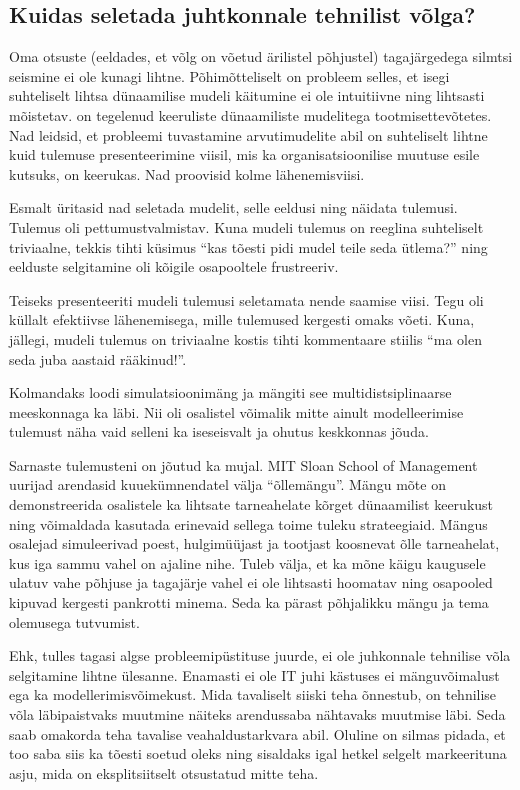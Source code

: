 \subsection{Kuidas seletada juhtkonnale tehnilist võlga?}
Oma otsuste (eeldades, et võlg on võetud ärilistel põhjustel) tagajärgedega silmtsi seismine ei ole kunagi lihtne. Põhimõtteliselt on probleem selles, et isegi suhteliselt lihtsa dünaamilise mudeli käitumine ei ole intuitiivne ning lihtsasti mõistetav. \citeauthor{ledet1994manufacturing} on tegelenud keeruliste dünaamiliste mudelitega tootmisettevõtetes\cite{ledet1994manufacturing}. Nad leidsid, et probleemi tuvastamine arvutimudelite abil on suhteliselt lihtne kuid tulemuse presenteerimine viisil, mis ka organisatsioonilise muutuse esile kutsuks, on keerukas. Nad proovisid kolme lähenemisviisi.

Esmalt üritasid nad seletada mudelit, selle eeldusi ning näidata tulemusi. Tulemus oli pettumustvalmistav. Kuna mudeli tulemus on reeglina suhteliselt triviaalne, tekkis tihti küsimus \enquote{kas tõesti pidi mudel teile seda ütlema?} ning eelduste selgitamine oli kõigile osapooltele frustreeriv.

Teiseks presenteeriti mudeli tulemusi seletamata nende saamise viisi. Tegu oli küllalt efektiivse lähenemisega, mille tulemused kergesti omaks võeti. Kuna, jällegi, mudeli tulemus on triviaalne kostis tihti kommentaare stiilis \enquote{ma olen seda juba aastaid rääkinud!}.

Kolmandaks loodi simulatsioonimäng ja mängiti see multidistsiplinaarse meeskonnaga ka läbi. Nii oli osalistel võimalik mitte ainult modelleerimise tulemust näha vaid selleni ka iseseisvalt ja ohutus keskkonnas jõuda. 

Sarnaste tulemusteni on jõutud ka mujal. MIT Sloan School of Management uurijad arendasid kuuekümnendatel välja \enquote{õllemängu}\cite{sterman1984instructions}. Mängu mõte on demonstreerida osalistele ka lihtsate tarneahelate kõrget dünaamilist keerukust ning võimaldada kasutada erinevaid sellega toime tuleku strateegiaid. Mängus osalejad simuleerivad poest, hulgimüüjast ja tootjast koosnevat õlle tarneahelat, kus iga sammu vahel on ajaline nihe. Tuleb välja, et ka mõne käigu kaugusele ulatuv vahe põhjuse ja tagajärje vahel ei ole lihtsasti hoomatav ning osapooled kipuvad kergesti pankrotti minema. Seda ka pärast põhjalikku mängu ja tema olemusega tutvumist. 

Ehk, tulles tagasi algse probleemipüstituse juurde, ei ole juhkonnale tehnilise võla selgitamine lihtne ülesanne. Enamasti ei ole IT juhi kästuses ei mänguvõimalust ega ka modellerimisvõimekust. Mida tavaliselt siiski teha õnnestub, on tehnilise võla läbipaistvaks muutmine näiteks arendussaba nähtavaks muutmise läbi. Seda saab omakorda teha tavalise veahaldustarkvara abil. Oluline on silmas pidada, et too saba siis ka tõesti soetud oleks ning sisaldaks igal hetkel selgelt markeerituna asju, mida on eksplitsiitselt otsustatud mitte teha. 
